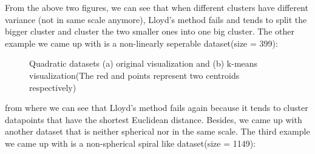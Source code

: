\documentclass[]{homework}
\begin{document}
From the above two figures, we can see that when different clusters have different variance (not in same scale anymore), Lloyd's method fails and tends to split the bigger cluster and cluster the two smaller ones into one big cluster.
The other example we came up with is a non-linearly seperable dataset(size = 399):
\begin{figure}[h!]
\centering
{}%
\label{figure2a}
\hfil
{}%
\label{figure2b}
\caption{Quadratic datasets (a) original visualization and (b) k-means visualization(The red and points represent two centroids respectively)}
\end{figure}\par
from where we can see that Lloyd's method fails again because it tends to cluster datapoints that have the shortest Euclidean distance.
Besides, we came up with another dataset that is neither spherical nor in the same scale. The third example we came up with is a non-spherical spiral like dataset(size = 1149):
\end{document}
